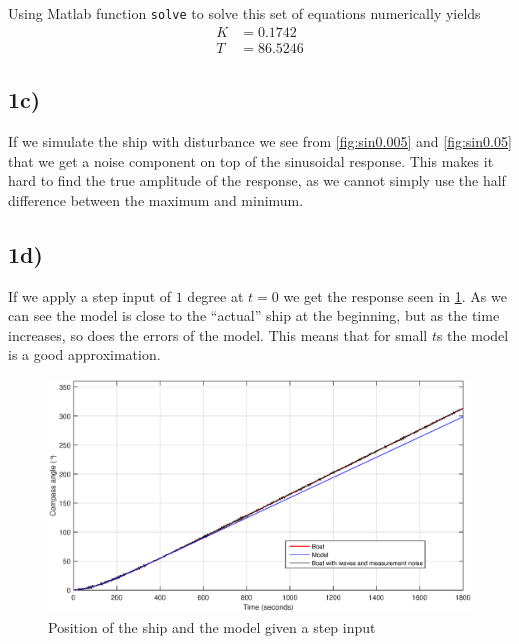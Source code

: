 Using Matlab function \texttt{solve} to solve this set of equations numerically yields
\begin{subequations}
	\begin{align}
		K &= 0.1742 \\
		T &= 86.5246
	\end{align}
\end{subequations}

\subsection{1c)}

If we simulate the ship with disturbance we see from \cref{fig:sin0.005}  and \cref{fig:sin0.05} that we get a noise component on top of the sinusoidal response. This makes it hard to find the true amplitude of the response, as we cannot simply use the half difference between the maximum and minimum.

\subsection{1d)}

If we apply a step input of $1$ degree at $t=0$ we get the response seen in \cref{fig:step_1}. As we can see the model is close to the ``actual'' ship at the beginning, but as the time increases, so does the errors of the model. This means that for small $t$s the model is a good approximation.

\begin{figure}
	\centering
	\includegraphics[width=\textwidth]{images/oppg1/step1_with_model_trafu.eps}
	\caption{Position of the ship and the model given a step input}
	\label{fig:step_1}
\end{figure}
